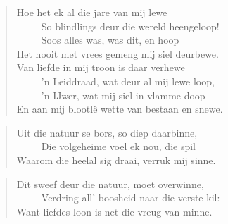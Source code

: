 \begin{verse}
Hoe het ek al die jare van mij lewe \\ 
\ \ \ \ \ So blindlings deur die wereld heengeloop! \\ 
\ \ \ \ \ Soos alles was, was dit, en hoop \\ 
Het nooit met vrees gemeng mij siel deurbewe. \\ 
Van liefde in mij troon is daar verhewe \\ 
\ \ \ \ \ ’n Leiddraad, wat deur al mij lewe loop, \\ 
\ \ \ \ \ ’n IJwer, wat mij siel in vlamme doop \\ 
En aan mij blootlê wette van bestaan en snewe. \\ 
\end{verse}

\begin{verse}
Uit die natuur se bors, so diep daarbinne, \\ 
\ \ \ \ \ Die volgeheime voel ek nou, die spil \\ 
Waarom die heelal sig draai, verruk mij sinne. \\ 
\end{verse}

\begin{verse}
Dit sweef deur die natuur, moet overwinne, \\ 
\ \ \ \ \ Verdring all’ boosheid naar die verste kil: \\ 
Want liefdes loon is net die vreug van minne. \\ 
\end{verse}